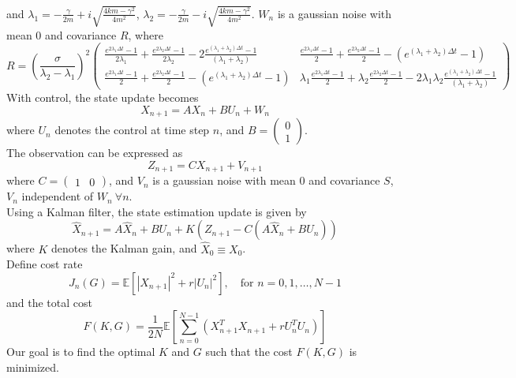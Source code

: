 \documentclass{article}
\begin{document}
and $\lambda_1 = -\frac{\gamma}{2m} + i\sqrt{\frac{4km-\gamma^2}{4m^2}}$, $\lambda_2 = -\frac{\gamma}{2m} - i\sqrt{\frac{4km-\gamma^2}{4m^2}}$. 
$W_n$ is a gaussian noise with mean 0 and covariance $R$, where 
\begin{equation*}
R = \left(\frac{\sigma}{\lambda_{2}-\lambda_{1}}\right)^{2}
    \begin{pmatrix}
    \frac{e^{2 \lambda_{1} \Delta t}-1}{2 \lambda_{1}}+\frac{e^{2 \lambda_{2} \Delta t}-1}{2 \lambda_{2}}-2 \frac{e^{\left(\lambda_{1}+\lambda_{2}\right) \Delta t}-1}{\left(\lambda_{1}+\lambda_{2}\right)} 
    & \frac{e^{2 \lambda_{1} \Delta t}-1}{2 }+\frac{e^{2 \lambda_{2} \Delta t}-1}{2 }- ({e^{\left(\lambda_{1}+\lambda_{2}\right) \Delta t}-1})  \\
    \frac{e^{2 \lambda_{1} \Delta t}-1}{2 }+\frac{e^{2 \lambda_{2} \Delta t}-1}{2 }- ({e^{\left(\lambda_{1}+\lambda_{2}\right) \Delta t}-1})  & 
     \lambda_{1}\frac{e^{2 \lambda_{1} \Delta t}-1}{2}+\lambda_{2}\frac{e^{2 \lambda_{2} \Delta t}-1}{2 }-2 \lambda_{1}\lambda_{2}\frac{e^{\left(\lambda_{1}+\lambda_{2}\right) \Delta t}-1}{\left(\lambda_{1}+\lambda_{2}\right)} \end{pmatrix}
\end{equation*}
With control, the state update becomes
\begin{equation*}
    X_{n+1} = AX_n + BU_n + W_n
\end{equation*}
where $U_n$ denotes the control at time step $n$, and $B = \begin{pmatrix} 0 \\1 \end{pmatrix}$.\\
The observation can be expressed as 
\begin{equation*}
Z_{n+1} = CX_{n+1} + V_{n+1}
\end{equation*}
where $C = \begin{pmatrix} 1 & 0\end{pmatrix}$, and $V_n$ is a gaussian noise with mean 0 and covariance $S$, $V_n$ independent of $W_n\ \forall n$.\\
Using a Kalman filter, the state estimation update is given by
\begin{equation*}\label{eq:est}
\widehat{X}_{n+1} = A\widehat{X}_n + BU_n + K(Z_{n+1} - C(A\widehat{X}_n + BU_n))
\end{equation*}
where $K$ denotes the Kalman gain, and $\widehat{X}_0 \equiv X_0$.\\
Define cost rate
\begin{equation*}
    J_n(G) = \mathbb{E}[ |X_{n+1}|^2+r|U_{n}|^2 ], \quad \text{for } n = 0, 1, \dots, N-1
\end{equation*}
and the total cost
\begin{equation*}
F(K,G) = \frac{1}{2N} \mathbb{E} [ \sum_{n=0}^{N-1} (X_{n+1}^T X_{n+1} + r U_n^T U_n)]
\end{equation*}
Our goal is to find the optimal $K$ and $G$ such that the cost $F(K,G)$ is minimized.
\end{document}
